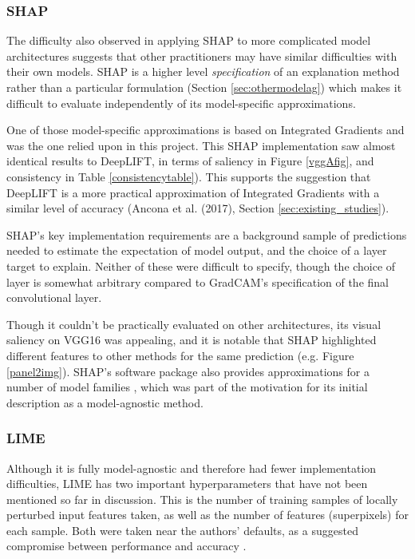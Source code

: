 \documentclass[main]{subfiles}
\begin{document}


\subsubsection{SHAP}
The difficulty also observed in applying SHAP to more complicated model architectures suggests that other practitioners may have similar difficulties with their own models. SHAP is a higher level \textit{specification} of an explanation method rather than a particular formulation (Section \ref{sec:othermodelag}) which makes it difficult to evaluate independently of its model-specific approximations.

One of those model-specific approximations is based on Integrated Gradients and was the one relied upon in this project. This SHAP implementation saw almost identical results to DeepLIFT, in terms of saliency in Figure \ref{vggAfig}, and consistency in Table \ref{consistencytable}). This supports the suggestion that DeepLIFT is a more practical approximation of Integrated Gradients with a similar level of accuracy (Ancona et al. (2017), Section \ref{sec:existing_studies}).

SHAP's key implementation requirements are a background sample of predictions needed to estimate the expectation of model output, and the choice of a layer target to explain. Neither of these were difficult to specify, though the choice of layer is somewhat arbitrary compared to GradCAM's specification of the final convolutional layer.

Though it couldn't be practically evaluated on other architectures, its visual saliency on VGG16 was appealing, and it is notable that SHAP highlighted different features to other methods for the same prediction (e.g. Figure \ref{panel2img}). SHAP's software package also provides approximations for a number of model families \cite{shaprepo}, which was part of the motivation for its initial description as a model-agnostic method.


\subsubsection{LIME}
Although it is fully model-agnostic and therefore had fewer implementation difficulties, LIME has two important hyperparameters that have not been mentioned so far in discussion. This is the number of training samples of locally perturbed input features taken, as well as the number of features (superpixels) for each sample. Both were taken near the authors' defaults, as a suggested compromise between performance and accuracy \cite{limerepo}.
\end{document}
